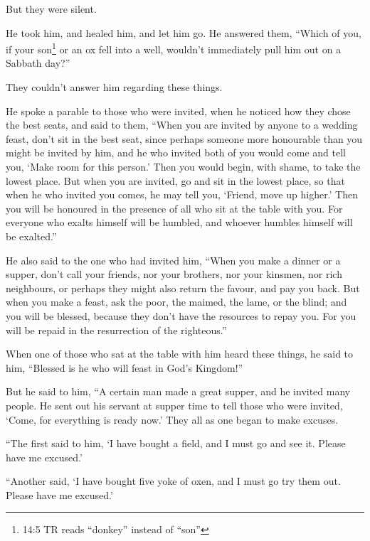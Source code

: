  But they were silent.

He took him, and healed him, and let him go.  He answered
them, ``Which of you, if your son\footnote{14:5 TR reads ``donkey''
  instead of ``son''} or an ox fell into a well, wouldn't immediately
pull him out on a Sabbath day?''

 They couldn't answer him regarding these things.

 He spoke a parable to those who were invited, when he
noticed how they chose the best seats, and said to them, 
``When you are invited by anyone to a wedding feast, don't sit in the
best seat, since perhaps someone more honourable than you might be
invited by him,  and he who invited both of you would come
and tell you, `Make room for this person.' Then you would begin, with
shame, to take the lowest place.  But when you are invited,
go and sit in the lowest place, so that when he who invited you comes,
he may tell you, `Friend, move up higher.' Then you will be honoured in
the presence of all who sit at the table with you.  For
everyone who exalts himself will be humbled, and whoever humbles himself
will be exalted.''

 He also said to the one who had invited him, ``When you
make a dinner or a supper, don't call your friends, nor your brothers,
nor your kinsmen, nor rich neighbours, or perhaps they might also return
the favour, and pay you back.  But when you make a feast,
ask the poor, the maimed, the lame, or the blind;  and you
will be blessed, because they don't have the resources to repay you. For
you will be repaid in the resurrection of the righteous.''

 When one of those who sat at the table with him heard
these things, he said to him, ``Blessed is he who will feast in God's
Kingdom!''

 But he said to him, ``A certain man made a great supper,
and he invited many people.  He sent out his servant at
supper time to tell those who were invited, `Come, for everything is
ready now.'  They all as one began to make excuses.

``The first said to him, `I have bought a field, and I must go and see
it. Please have me excused.'

 ``Another said, `I have bought five yoke of oxen, and I
must go try them out. Please have me excused.'

